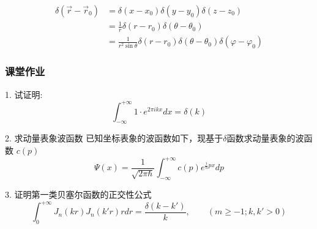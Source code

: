 \begin{frame}
	\frametitle{}
	 \[
		\begin{aligned}
		  \delta (\vec{r}-\vec{r}_0) &=  \delta (x-x_0) \delta (y-y_0) \delta (z-z_0)\\
		  &=  \frac{1}{r}\delta (r-r_0) \delta (\theta -\theta_0) \\
		  &=  \frac{1}{r^2\sin\theta}\delta (r-r_0) \delta (\theta -\theta_0) \delta (\varphi -\varphi_0)
		\end{aligned}
		   \]
\end{frame}

\begin{frame}
	\frametitle{课堂作业}
	 \begin{exampleblock}{1. 试证明:}
	 \[
	\int_{-\infty}^{+\infty} 1 \cdot e^{2\pi i kx} d x = \delta(k)
	\]
	 \end{exampleblock}
	\begin{exampleblock} {2. 求动量表象波函数}
	{已知坐标表象的波函数如下，现基于$\delta$函数求动量表象的波函数 $c(p)$}
		\begin{equation*}
			\Psi(x)=\frac{1}{\sqrt{2\pi \hbar}}  \int_{-\infty}^{+\infty} c(p) e^{\frac{i}{\hbar} px} dp 
		\end{equation*}   	
	\end{exampleblock}
\begin{exampleblock} {3. 证明第一类贝塞尔函数的正交性公式}
	\[\int_{0}^{+\infty} J_n(kr)J_n(k'r) r dr = \frac{\delta(k-k')}{k}, \qquad (m\geq-1; k, k'>0)\]  	
	\end{exampleblock}
\end{frame}
